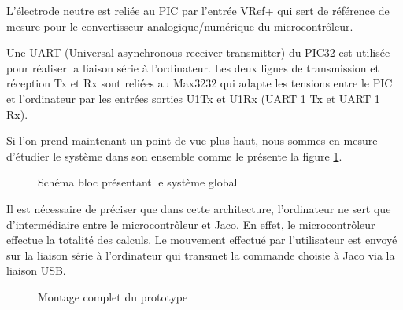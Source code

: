 \documentclass[letterpaper, twoside, 12pt, memoire, creativecommons, hyperref]{thETS}
\begin{document}
L'électrode neutre est reliée au PIC par l'entrée VRef+ qui sert de référence de mesure pour le convertisseur analogique/numérique du microcontrôleur. 

Une UART (Universal asynchronous receiver transmitter) du PIC32 est utilisée pour réaliser la liaison série à l'ordinateur. Les deux lignes de transmission et réception Tx et Rx sont reliées au Max3232 qui adapte les tensions entre le PIC et l'ordinateur par les entrées sorties U1Tx et U1Rx (UART 1 Tx et UART 1 Rx).

Si l'on prend maintenant un point de vue plus haut, nous sommes en mesure d'étudier le système dans son ensemble comme le présente la figure \ref{fig:archiMatTot}.

\begin{figure}
	\centering
	\caption{Schéma bloc présentant le système global}
	\label{fig:archiMatTot}
\end{figure}

Il est nécessaire de préciser que dans cette architecture, l'ordinateur ne sert que d'intermédiaire entre le microcontrôleur et Jaco. En effet, le microcontrôleur effectue la totalité des calculs. Le mouvement effectué par l'utilisateur est envoyé sur la liaison série à l'ordinateur qui transmet la commande choisie à Jaco via la liaison USB. 

\begin{figure}
	\centering
	\caption{Montage complet du prototype}
	\label{fig:archiMatMont}
\end{figure}
\end{document}
